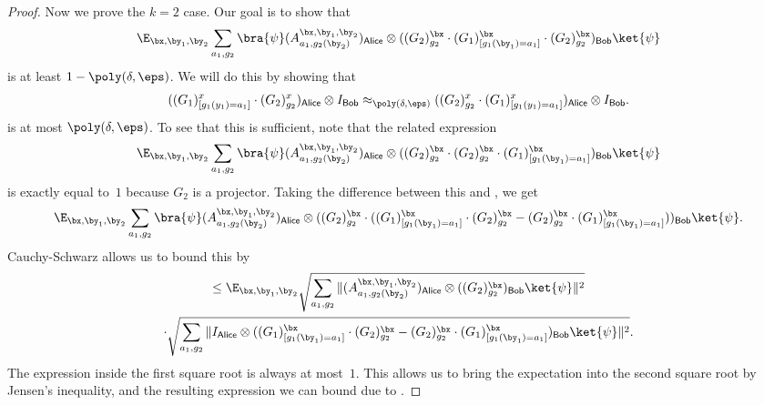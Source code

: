 \documentclass[11pt]{article}
\newcommand{\reg}[1]{{\mathsf{#1}}}
\begin{document}
\begin{proof}
Now we prove the $k = 2$ case.
Our goal is to show that
\begin{equation}\label{eq:food-rakes}
\E_{\bx, \by_1, \by_2} \sum_{a_1, g_2} \bra{\psi} (A^{\bx, \by_1, \by_2}_{a_1, g_2(\by_2)})_{\reg{Alice}}
\otimes ((G_2)^{\bx}_{g_2} \cdot (G_1)^{\bx}_{[g_1(\by_1) = a_1]} \cdot (G_2)^{\bx}_{g_2})_{\reg{Bob}} \ket{\psi}
\end{equation}
is at least $1- \poly(\delta, \eps)$.
We will do this by showing that
\begin{equation}\label{eq:what-a-johnnie-wants}
((G_1)^x_{[g_1(y_1)=a_1]} \cdot (G_2)^x_{g_2})_{\reg{Alice}} \otimes I_{\reg{Bob}}
\approx_{\poly(\delta, \eps)} ((G_2)^x_{g_2} \cdot (G_1)^x_{[g_1(y_1)=a_1]})_{\reg{Alice}} \otimes I_{\reg{Bob}}.
\end{equation}
is at most $\poly(\delta, \eps)$.
To see that this is sufficient, note that the related expression
\begin{equation*}
\E_{\bx, \by_1, \by_2} \sum_{a_1, g_2} \bra{\psi} (A^{\bx, \by_1, \by_2}_{a_1, g_2(\by_2)})_{\reg{Alice}}
\otimes ((G_2)^{\bx}_{g_2} \cdot (G_2)^{\bx}_{g_2} \cdot (G_1)^{\bx}_{[g_1(\by_1) = a_1]})_{\reg{Bob}} \ket{\psi}
\end{equation*}
is exactly equal to~$1$ because $G_2$ is a projector.
Taking the difference between this and , we get
\begin{equation*}
\E_{\bx, \by_1, \by_2} \sum_{a_1, g_2} \bra{\psi} (A^{\bx, \by_1, \by_2}_{a_1, g_2(\by_2)})_{\reg{Alice}}
\otimes ((G_2)^{\bx}_{g_2} \cdot ((G_1)^{\bx}_{[g_1(\by_1) = a_1]} \cdot (G_2)^{\bx}_{g_2}- (G_2)^{\bx}_{g_2} \cdot (G_1)^{\bx}_{[g_1(\by_1) = a_1]}))_{\reg{Bob}} \ket{\psi}.
\end{equation*}
Cauchy-Schwarz allows us to bound this by
\begin{multline*}
\leq \E_{\bx, \by_1, \by_2} \sqrt{ \sum_{a_1, g_2}\Vert (A^{\bx, \by_1, \by_2}_{a_1, g_2(\by_2)})_{\reg{Alice}} \otimes ((G_2)^{\bx}_{g_2})_{\reg{Bob}} \ket{\psi} \Vert^2}\\
	\cdot \sqrt{ \sum_{a_1, g_2}\Vert I_{\reg{Alice}} \otimes ((G_1)^{\bx}_{[g_1(\by_1) = a_1]} \cdot (G_2)^{\bx}_{g_2}- (G_2)^{\bx}_{g_2} \cdot (G_1)^{\bx}_{[g_1(\by_1) = a_1]})_{\reg{Bob}} \ket{\psi} \Vert^2}.
\end{multline*}
The expression inside the first square root is always at most~$1$.
This allows us to bring the expectation into the second square root by Jensen's inequality,
and the resulting expression we can bound due to .


\end{proof}
\end{document}
